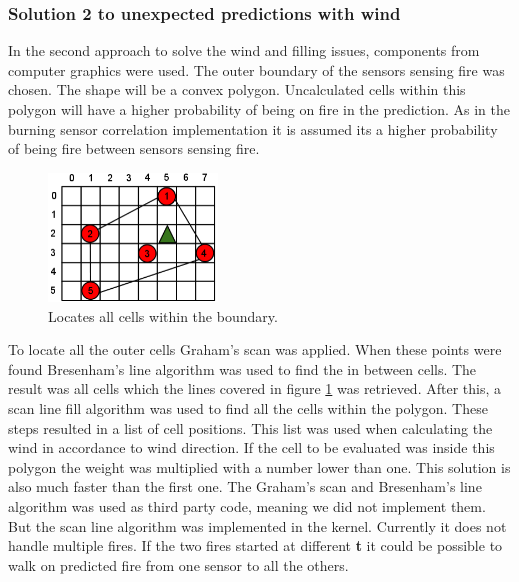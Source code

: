 \subsubsection{Solution 2 to unexpected predictions with wind}
In the second approach to solve the wind and filling issues, components from computer graphics were used. The outer boundary of the sensors sensing fire was chosen. The shape will be a convex polygon. Uncalculated cells within this polygon will have a higher probability of being on fire in the prediction. As in the burning sensor correlation implementation it is assumed its a higher probability of being fire between sensors sensing fire.
\begin{figure}[here]
  \centering
      \includegraphics[width=0.4\textwidth]{solution/graphics/graphical-boundary.png}
  \caption{Locates all cells within the boundary.}
  \label{fig:graphical-boundary}
\end{figure}
To locate all the outer cells Graham's scan \cite{graham} was applied. When these points were found Bresenham's\cite{bresenham} line algorithm was used to find the in between cells. The result was all cells which the lines covered in figure \ref{fig:graphical-boundary} was retrieved. After this, a scan line fill algorithm was used to find all the cells within the polygon. These steps resulted in a list of cell positions. This list was used when calculating the wind in accordance to wind direction. If the cell to be evaluated was inside this polygon the weight was multiplied with a number lower than one. This solution is also much faster than the first one. The Graham's scan and Bresenham's line algorithm was used as third party code, meaning we did not implement them. But the scan line algorithm was implemented in the kernel. Currently it does not handle multiple fires. If the two fires started at different \textbf{t} it could be possible to walk on predicted fire from one sensor to all the others.
